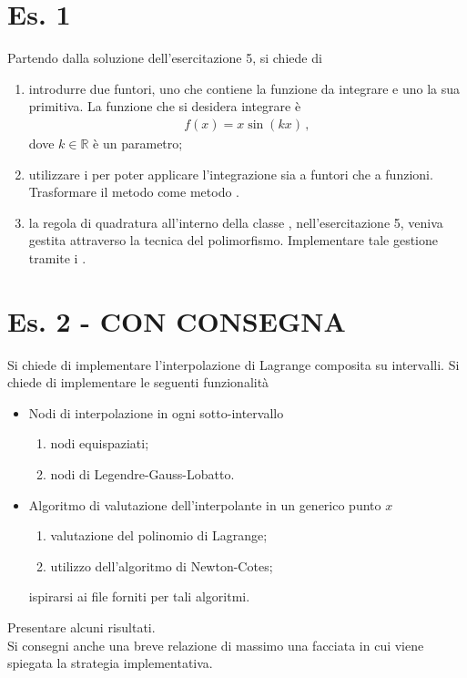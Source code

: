 \section*{Es. 1}
Partendo dalla soluzione dell'esercitazione 5, si chiede di
\begin{enumerate}
	\item introdurre due funtori, uno che contiene la funzione da integrare e uno la sua primitiva. La funzione che si desidera integrare \`e
		\begin{align*}
			f(x) = x \sin(k x)\,,
		\end{align*}
		dove $k \in \mathbb{R}$ \`e un parametro;
	\item utilizzare i  per poter applicare l'integrazione sia a funtori che a funzioni. Trasformare il metodo  come metodo .
	\item la regola di quadratura all'interno della classe , nell'esercitazione 5, veniva gestita attraverso la tecnica del polimorfismo. Implementare tale gestione tramite i .
\end{enumerate}

\section*{Es. 2 - CON CONSEGNA}
Si chiede di implementare l'interpolazione di Lagrange composita su intervalli. Si chiede di implementare le seguenti funzionalit\`a
\begin{itemize}
	\item Nodi di interpolazione in ogni sotto-intervallo
		\begin{enumerate}
			\item nodi equispaziati;
			\item nodi di Legendre-Gauss-Lobatto.
		\end{enumerate}
	\item Algoritmo di valutazione dell'interpolante in un generico punto $x$
		\begin{enumerate}
			\item valutazione del polinomio di Lagrange;
			\item utilizzo dell'algoritmo di Newton-Cotes;
		\end{enumerate}
		ispirarsi ai file forniti per tali algoritmi.	
\end{itemize}
Presentare alcuni risultati.\\
Si consegni anche una breve relazione di massimo una facciata in cui viene spiegata la strategia implementativa.
	